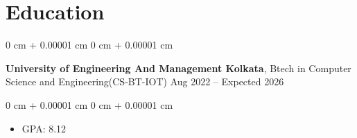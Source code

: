 \documentclass[12pt, a3paper]{article}
\newenvironment{highlights}{
    \begin{itemize}[
        topsep=0.10 cm,
        parsep=0.10 cm,
        partopsep=0pt,
        itemsep=0pt,
        leftmargin=0 cm + 10pt
    ]
}{
    \end{itemize}
} %
\newenvironment{highlightsforbulletentries}{
    \begin{itemize}[
        topsep=0.10 cm,
        parsep=0.10 cm,
        partopsep=0pt,
        itemsep=0pt,
        leftmargin=10pt
    ]
}{
    \end{itemize}
} %
\newenvironment{onecolentry}{
    \begin{adjustwidth}{
        0 cm + 0.00001 cm
    }{
        0 cm + 0.00001 cm
    }
}{
    \end{adjustwidth}
} %
\newenvironment{twocolentry}[2][]{
    \onecolentry
    \def\secondColumn{#2}
    \setcolumnwidth{\fill, 4.5 cm}
    \begin{paracol}{2}
}{
    \switchcolumn \raggedleft \secondColumn
    \end{paracol}
    \endonecolentry
} %
\begin{document}
    









    \section{Education}



        
        \begin{twocolentry}{
            Aug 2022 – Expected 2026
        }
            \textbf{University of Engineering And Management Kolkata}, Btech in Computer Science and Engineering(CS-BT-IOT)\end{twocolentry}

        \vspace{0.10 cm}
        \begin{onecolentry}
            \begin{highlights}
                \item GPA: 8.12 
            \end{highlights}
        \end{onecolentry}



    
\end{document}
